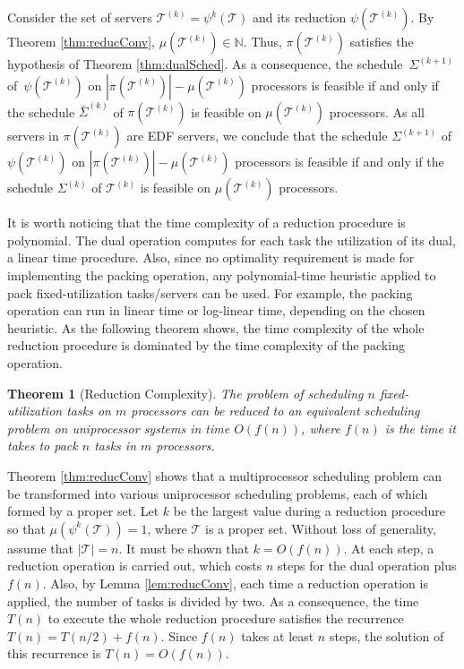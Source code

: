 \documentclass[twocolumn, compsocconf]{IEEEtran}
\newtheorem{theorem}{Theorem}[section]
\newcommand{\reduc}{\ensuremath{\psi}}\newcommand{\reducMap}{\ensuremath{\psi}}\newcommand{\util}{\ensuremath{\mu}\xspace}
\newcommand{\pack}{\ensuremath{\pi}}
\newcommand{\Nat}{\ensuremath{\mathbb{N}}\xspace}
\newcommand{\sched}{\ensuremath{\Sigma}\xspace}
\newcommand{\servSet}{\ensuremath{\mathcal{T}}}
\newcounter{proc}
\newcounter{step}
\begin{document}
\begin{IEEEproof}
  Consider the set of servers $\servSet^{(k)} = \reduc^k(\servSet)$ and its
  reduction $\reduc(\servSet^{(k)})$. By Theorem \ref{thm:reducConv},
  $\util(\servSet^{(k)}) \in \Nat$. Thus, $\pack(\servSet^{(k)})$ satisfies the
  hypothesis of Theorem \ref{thm:dualSched}. As a consequence, the schedule
  $\,\sched^{(k+1)}$ of $\,\reduc(\servSet^{(k)})$ on $|\pack(\servSet^{(k)})| -
  \util(\servSet^{(k)})$ processors is feasible if and only if the schedule
  $\bar{\sched}^{(k)}$ of $\pack(\servSet^{(k)})$ is feasible on
  $\util(\servSet^{(k)})$ processors.  As all servers in $\pack(\servSet^{(k)})$
  are EDF servers, we conclude that the schedule $\sched^{(k+1)}$ of
  $\reduc(\servSet^{(k)})$ on $|\pack(\servSet^{(k)})| - \util(\servSet^{(k)})$
  processors is feasible if and only if the schedule $\sched^{(k)}$ of
  $\servSet^{(k)}$ is feasible on $\util(\servSet^{(k)})$ processors.
\end{IEEEproof}

It is worth noticing that the time complexity of a reduction procedure is
polynomial. The dual operation computes for each task the utilization of its
dual, a linear time procedure. Also, since no optimality requirement is made for
implementing the packing operation, any polynomial-time heuristic applied to
pack fixed-utilization tasks/servers can be used. For example, the packing
operation can run in linear time or log-linear time, depending on the chosen
heuristic. As the following theorem shows, the time complexity of the whole
reduction procedure is dominated by the time complexity of the packing
operation.

\begin{theorem}[Reduction Complexity]\label{thm:complexity}
  The problem of scheduling $n$ fixed-utilization tasks on $m$ processors can be
  reduced to an equivalent scheduling problem on uniprocessor systems in time
  $O(f(n))$, where $f(n)$ is the time it takes to pack $n$ tasks in $m$
  processors.
\end{theorem}

\begin{IEEEproof}
  Theorem \ref{thm:reducConv} shows that a multiprocessor scheduling problem can
  be transformed into various uniprocessor scheduling problems, each of which
  formed by a proper set. Let $k$ be the largest value during a reduction
  procedure so that $\util(\reduc^k(\servSet)) = 1$, where $\servSet$ is a
  proper set. Without loss of generality, assume that $|\servSet| = n$. It must
  be shown that $k = O(f(n))$. At each step, a reduction operation is carried
  out, which costs $n$ steps for the dual operation plus $f(n)$.  Also, by Lemma
  \ref{lem:reducConv}, each time a reduction operation is applied, the number of
  tasks is divided by two. As a consequence, the time $T(n)$ to execute the
  whole reduction procedure satisfies the recurrence $T(n) = T(n/2) +
  f(n)$. Since $f(n)$ takes at least $n$ steps, the solution of this recurrence
  is $T(n) = O(f(n))$.
\end{IEEEproof}
\end{document}
